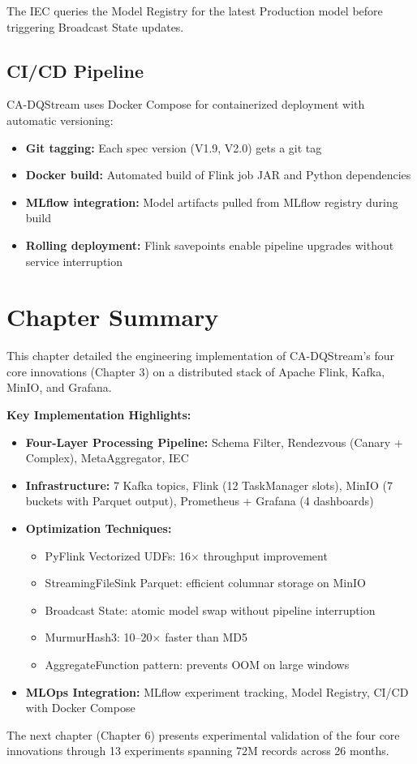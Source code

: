 The IEC queries the Model Registry for the latest Production model before triggering Broadcast State updates.

\subsection{CI/CD Pipeline}

CA-DQStream uses Docker Compose for containerized deployment with automatic versioning:

\begin{itemize}
    \item \textbf{Git tagging:} Each spec version (V1.9, V2.0) gets a git tag
    \item \textbf{Docker build:} Automated build of Flink job JAR and Python dependencies
    \item \textbf{MLflow integration:} Model artifacts pulled from MLflow registry during build
    \item \textbf{Rolling deployment:} Flink savepoints enable pipeline upgrades without service interruption
\end{itemize}

\section{Chapter Summary}

This chapter detailed the engineering implementation of CA-DQStream's four core innovations (Chapter 3) on a distributed stack of Apache Flink, Kafka, MinIO, and Grafana.

\textbf{Key Implementation Highlights:}

\begin{itemize}
    \item \textbf{Four-Layer Processing Pipeline:} Schema Filter, Rendezvous (Canary + Complex), MetaAggregator, IEC
    \item \textbf{Infrastructure:} 7 Kafka topics, Flink (12 TaskManager slots), MinIO (7 buckets with Parquet output), Prometheus + Grafana (4 dashboards)
    \item \textbf{Optimization Techniques:}
        \begin{itemize}
            \item PyFlink Vectorized UDFs: 16$\times$ throughput improvement
            \item StreamingFileSink Parquet: efficient columnar storage on MinIO
            \item Broadcast State: atomic model swap without pipeline interruption
            \item MurmurHash3: 10--20$\times$ faster than MD5
            \item AggregateFunction pattern: prevents OOM on large windows
        \end{itemize}
    \item \textbf{MLOps Integration:} MLflow experiment tracking, Model Registry, CI/CD with Docker Compose
\end{itemize}

The next chapter (Chapter 6) presents experimental validation of the four core innovations through 13 experiments spanning 72M records across 26 months.
